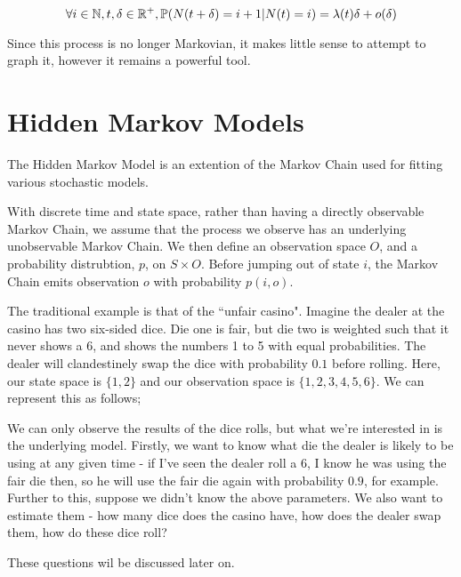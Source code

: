 $$
\forall i \in \mathbb{N}, t,\delta \in \mathbb{R}^{+}, \mathbb{P} (N(t+\delta) = i+1 | N(t) = i) = \lambda(t) \delta + o(\delta)
$$

Since this process is no longer Markovian, it makes little sense to attempt to graph it, however it remains a powerful tool.

\section{Hidden Markov Models}

The Hidden Markov Model is an extention of the Markov Chain used for fitting various stochastic models.

With discrete time and state space, rather than having a directly observable Markov Chain, we assume that the process we observe has an underlying unobservable Markov Chain. We then define an observation space $O$, and a probability distrubtion, $p$, on $S \times O$. Before jumping out of state $i$, the Markov Chain emits observation $o$ with probability $p(i,o)$.

The traditional example is that of the ``unfair casino". Imagine the dealer at the casino has two six-sided dice. Die one is fair, but die two is weighted such that it never shows a $6$, and shows the numbers 1 to 5 with equal probabilities. The dealer will clandestinely swap the dice with probability $0.1$ before rolling. Here, our state space is $\{1,2\}$ and our observation space is $\{1,2,3,4,5,6\}$. We can represent this as follows;

We can only observe the results of the dice rolls, but what we're interested in is the underlying model. Firstly, we want to know what die the dealer is likely to be using at any given time - if I've seen the dealer roll a 6, I know he was using the fair die then, so he will use the fair die again with probability $0.9$, for example. Further to this, suppose we didn't know the above parameters. We also want to estimate them - how many dice does the casino have, how does the dealer swap them, how do these dice roll?

These questions wil be discussed later on.